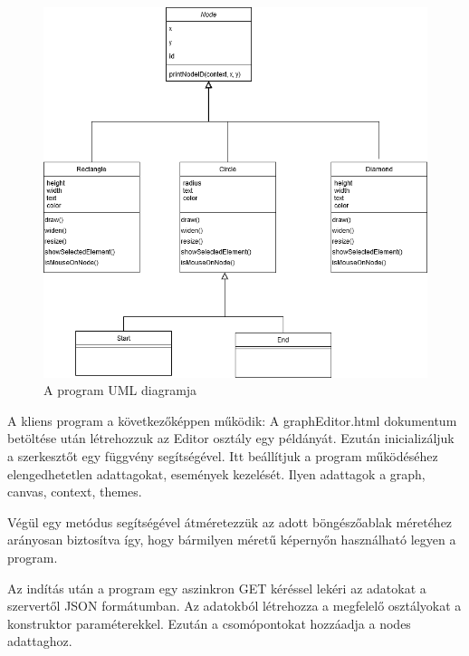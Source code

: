 

\begin{figure}[h]
\centering
\includegraphics[scale=0.5]{images/umldiagram.png}
\caption{A program UML diagramja}
\label{fig:uml}
\end{figure}

A kliens program a következőképpen működik: A graphEditor.html dokumentum betöltése után létrehozzuk az Editor osztály egy példányát. Ezután inicializáljuk a szerkesztőt egy függvény segítségével. Itt beállítjuk a program működéséhez elengedhetetlen adattagokat, események kezelését. Ilyen adattagok a graph, canvas, context, themes.

Végül egy metódus segítségével átméretezzük az adott böngészőablak méretéhez arányosan biztosítva így, hogy bármilyen méretű képernyőn használható legyen a program.

Az indítás után a program egy aszinkron GET kéréssel lekéri az adatokat a szervertől JSON formátumban. Az adatokból létrehozza a megfelelő osztályokat a konstruktor paraméterekkel. Ezután a csomópontokat hozzáadja a nodes adattaghoz.

